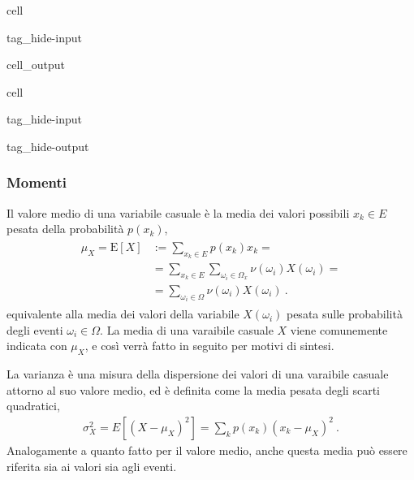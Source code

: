 \documentclass[letterpaper,10pt,italian]{jupyterBook}
\begin{document}
\begin{sphinxuseclass}{cell}
\begin{sphinxuseclass}{tag_hide-input}\begin{sphinxVerbatimOutput}

\begin{sphinxuseclass}{cell_output}
\noindent{}

\end{sphinxuseclass}\end{sphinxVerbatimOutput}

\end{sphinxuseclass}
\end{sphinxuseclass}
\begin{sphinxuseclass}{cell}
\begin{sphinxuseclass}{tag_hide-input}
\begin{sphinxuseclass}{tag_hide-output}
\end{sphinxuseclass}
\end{sphinxuseclass}
\end{sphinxuseclass}

\subsubsection{Momenti}
\label{\detokenize{ch/statistics/random_variables_discrete:momenti}}
\sphinxAtStartPar
{} Il valore medio di una variabile casuale è la media dei valori possibili \(x_k \in E\) pesata della probabilità \(p(x_k)\),
\begin{equation*}
\begin{split}\begin{aligned}
 \mu_X = \text{E}[X] 
  & := \sum_{x_k \in E} p(x_k) x_k = \\
  & = \sum_{x_k \in E} \sum_{\omega_i \in \Omega_x} \nu(\omega_i) X(\omega_i) = \\
  & = \sum_{\omega_i \in \Omega} \nu(\omega_i) X(\omega_i) \ .
\end{aligned}\end{split}
\end{equation*}
\sphinxAtStartPar
equivalente alla media dei valori della variabile \(X(\omega_i)\) pesata sulle probabilità degli eventi \(\omega_i \in \Omega\). La media di una varaibile casuale \(X\) viene comunemente indicata con \(\mu_X\), e così verrà fatto in seguito per motivi di sintesi.

\sphinxAtStartPar
{} La varianza è una misura della dispersione dei valori di una varaibile casuale attorno al suo valore medio, ed è definita come la media pesata degli scarti quadratici,
\begin{equation*}
\begin{split}\sigma^2_X = E[(X-\mu_X)^2] = \sum_k p(x_k) (x_k - \mu_X)^2 \ .\end{split}
\end{equation*}
\sphinxAtStartPar
Analogamente a quanto fatto per il valore medio, anche questa media può essere riferita sia ai valori sia agli eventi.
\end{document}
